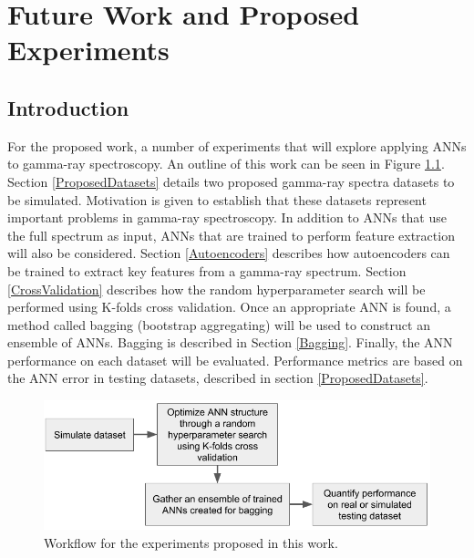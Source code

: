 \documentclass[tocnosub,noragright,centerchapter,12pt,fullpage]{uiucecethesis09}
\begin{document}


\chapter{Future Work and Proposed Experiments} \label{FutureWork}

\section{Introduction}

For the proposed work, a number of experiments that will explore applying ANNs to gamma-ray spectroscopy. An outline of this work can be seen in Figure \ref{fig:ANN_workflow}. Section \ref{ProposedDatasets} details two proposed gamma-ray spectra datasets to be simulated. Motivation is given to establish that these datasets represent important problems in gamma-ray spectroscopy. In addition to ANNs that use the full spectrum as input, ANNs that are trained to perform feature extraction will also be considered. Section \ref{Autoencoders} describes how autoencoders can be trained to extract key features from a gamma-ray spectrum. Section \ref{CrossValidation} describes how the random hyperparameter search will be performed using K-folds cross validation. Once an appropriate ANN is found, a method called bagging (bootstrap aggregating) will be used to construct an ensemble of ANNs. Bagging is described in Section \ref{Bagging}. Finally, the ANN performance on each dataset will be evaluated. Performance metrics are based on the ANN error in testing datasets, described in section \ref{ProposedDatasets}.%




\begin{figure}[H]
\centering
\includegraphics[width=0.8\linewidth]{images/ANN_workflow}
\caption{Workflow for the experiments proposed in this work.}
\label{fig:ANN_workflow}
\end{figure}
\end{document}
